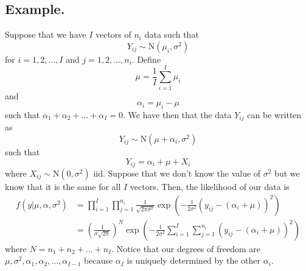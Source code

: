 \documentclass[titlepage]{article}
\begin{document}
\subsection{Example.} Suppose that we have $I$ vectors of $n_{i}$ data such that 
$$Y_{ij} \sim \text{N}(\mu_{i}, \sigma^{2})$$
for $i = 1, 2, \ldots, I$ and $j = 1, 2, \ldots, n_{i}$. Define 
$$\mu = \frac{1}{I}\sum_{i=1}^{I}\mu_{i}$$
and 
$$\alpha_{i} = \mu_{i} - \mu$$
such that $\alpha_{1} + \alpha_{2} + \ldots + \alpha_{I} = 0$. We have then that the data $Y_{ij}$ can be written as
$$Y_{ij} \sim \text{N}(\mu + \alpha_{i}, \sigma^{2})$$
such that 
$$Y_{ij} = \alpha_{i} + \mu + X_{i}$$
where $X_{ij} \sim \text{N}(0, \sigma^{2})$ iid. Suppose that we don't know the value of $\sigma^{2}$ but we know that it is the same for all $I$ vectors. Then, the likelihood of our data is 
\begin{align*}
    f(y|\mu, \alpha, \sigma^{2}) &= \prod_{i=1}^{I}\prod_{j=1}^{n_{i}}\frac{1}{\sqrt{2\pi\sigma^{2}}}\exp\left(-\frac{1}{2\sigma^{2}}(y_{ij} - (\alpha_{i} + \mu))^{2}\right) \\
                                 &= \left(\frac{1}{\sigma\sqrt{2\pi}}\right)^{N}\exp\left(-\frac{1}{2\sigma^{2}}\sum_{i=1}^{I}\sum_{j=1}^{n_{i}}(y_{ij} - (\alpha_{i} + \mu))^{2}\right)
\end{align*}
where $N = n_{1} + n_{2} + \ldots + n_{I}$. Notice that our degrees of freedom are $\mu, \sigma^{2}, \alpha_{1}, \alpha_{2}, \ldots, \alpha_{I-1}$ because $\alpha_{I}$ is uniquely determined by the other $\alpha_{i}$.
\end{document}
